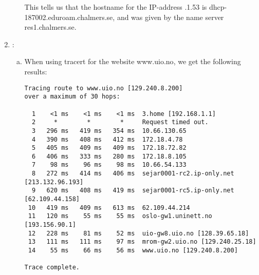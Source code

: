 \documentclass[a4paper,9pt,fleqn]{article}
\begin{document}
\begin{enumerate}[{Task} 1]
\begin{enumerate}[a)]
		This tells us that the hostname for the IP-address {.1.53} is
		{\outp dhcp-187002.eduroam.chalmers.se}, and was given by the name server
		{\outp res1.chalmers.se}.
	\end{enumerate}

	\item :
	\begin{enumerate}[a)]
		\item 
		When using {\outp tracert} for the website {\outp www.uio.no}, we get the following
		results:
		
\newpage

\begin{lstlisting}
Tracing route to www.uio.no [129.240.8.200]
over a maximum of 30 hops:

  1    <1 ms    <1 ms    <1 ms  3.home [192.168.1.1] 
  2     *        *        *     Request timed out.
  3   296 ms   419 ms   354 ms  10.66.130.65 
  4   390 ms   408 ms   412 ms  172.18.4.78 
  5   405 ms   409 ms   409 ms  172.18.72.82 
  6   406 ms   333 ms   280 ms  172.18.8.105 
  7    98 ms    96 ms    98 ms  10.66.54.133 
  8   272 ms   414 ms   406 ms  sejar0001-rc2.ip-only.net [213.132.96.193] 
  9   620 ms   408 ms   419 ms  sejar0001-rc5.ip-only.net [62.109.44.158] 
 10   419 ms   409 ms   613 ms  62.109.44.214 
 11   120 ms    55 ms    55 ms  oslo-gw1.uninett.no [193.156.90.1] 
 12   228 ms    81 ms    52 ms  uio-gw8.uio.no [128.39.65.18] 
 13   111 ms   111 ms    97 ms  mrom-gw2.uio.no [129.240.25.18] 
 14    55 ms    66 ms    56 ms  www.uio.no [129.240.8.200] 

Trace complete.
\end{lstlisting}


\end{enumerate}
\end{enumerate}
\end{document}
